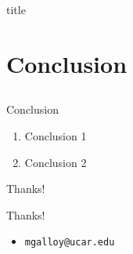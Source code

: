 \documentclass{beamer}
\begin{document}
\begin{frame}{title}
\end{frame}


\section{Conclusion}
\subsection*{}

\begin{frame}{Conclusion}
  \begin{enumerate}
    \item Conclusion 1
    \item Conclusion 2
  \end{enumerate}
\end{frame}

\begin{frame}{Thanks!}
  \begin{center}{\huge Thanks!}\end{center}
  \begin{itemize}
    \item {\tt mgalloy@ucar.edu}
  \end{itemize}
\end{frame}
\end{document}
